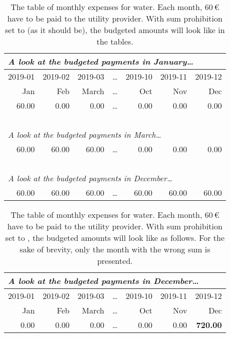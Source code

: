 \begin{table}[hbtp]
	\centering
	\sffamily
	\caption[The Tables of Monthly Expenses for Water]{The table of monthly expenses for water.
	Each month, 60\,€ have to be paid to the utility provider.
	With sum prohibition set to  (as it should be), the budgeted amounts will look like in the tables.}
	\label{tab:example-budgeting-utility-water-good}
	\begin{tabular}{|r|r|r|r|r|r|r|}
		\multicolumn{7}{l}{\footnotesize \emph{A look at the budgeted payments in January\ldots}}\\
		\hline
		\small 2019-01 & \small 2019-02 & \small 2019-03 & \ldots & \small 2019-10 & \small 2019-11 & \small 2019-12\\
		\hline
		Jan & Feb & March & \ldots & Oct & Nov & Dec\\
		\hline
		\hline
		60.00 & 0.00 & 0.00 & \ldots & 0.00 & 0.00 & 0.00\\
		\hline
		\multicolumn{7}{l}{~}\\
		\multicolumn{7}{l}{\footnotesize \emph{A look at the budgeted payments in March\ldots}}\\
		\hline
		60.00 & 60.00 & 60.00 & \ldots & 0.00 & 0.00 & 0.00\\
		\hline
		\multicolumn{7}{l}{~}\\
		\multicolumn{7}{l}{\footnotesize \emph{A look at the budgeted payments in December\ldots}}\\
		\hline
		60.00 & 60.00 & 60.00 & \ldots & 60.00 & 60.00 & 60.00\\
		\hline
	\end{tabular}
\end{table}

\begin{table}[hbtp]
	\centering
	\sffamily
	\caption[Budgeting Example: The Tables of Budgeted Monthly Expenses for the Item Utility: Water]{The table of monthly expenses for water.
	Each month, 60\,€ have to be paid to the utility provider.
	With sum prohibition set to , the budgeted amounts will look like as follows.
	For the sake of brevity, only the month with the wrong sum is presented.}
	\label{tab:example-budgeting-utility-water-bad}
	\begin{tabular}{|r|r|r|r|r|r|r|}
		\multicolumn{7}{l}{\footnotesize \emph{A look at the budgeted payments in December\ldots}}\\
		\hline
		\small 2019-01 & \small 2019-02 & \small 2019-03 & \ldots & \small 2019-10 & \small 2019-11 & \small 2019-12\\
		\hline
		Jan & Feb & March & \ldots & Oct & Nov & Dec\\
		\hline
		\hline
		0.00 & 0.00 & 0.00 & \ldots & 0.00 & 0.00 & \textbf{720.00}\color{black!60!red}\ding{53}\\
		\hline
	\end{tabular}
\end{table}